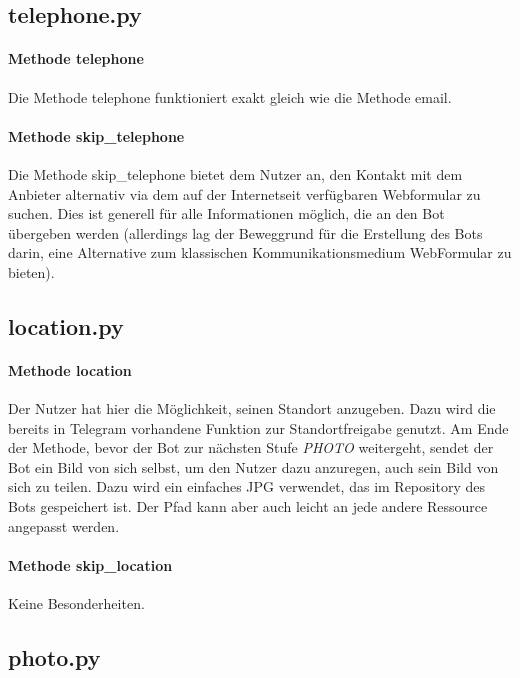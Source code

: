             
        \subsection{telephone.py}
            \paragraph{Methode telephone}
                Die Methode telephone funktioniert exakt gleich wie die Methode email.

            \paragraph{Methode skip\_telephone}
                Die Methode skip\_telephone bietet dem Nutzer an, den Kontakt mit dem Anbieter alternativ via dem auf der Internetseit verfügbaren Webformular zu suchen. Dies ist generell für alle Informationen möglich, die an den Bot übergeben werden (allerdings lag der Beweggrund für die Erstellung des Bots darin, eine Alternative zum klassischen Kommunikationsmedium Web\-Formular zu bieten).
        
        
        \subsection{location.py}
            \paragraph{Methode location}
                Der Nutzer hat hier die Möglichkeit, seinen Standort anzugeben. Dazu wird die bereits in Telegram vorhandene Funktion zur Standortfreigabe genutzt. 
                Am Ende der Methode, bevor der Bot zur nächsten Stufe \emph{PHOTO} weitergeht, sendet der Bot ein Bild von sich selbst, um den Nutzer dazu anzuregen, auch sein Bild von sich zu teilen. Dazu wird ein einfaches JPG verwendet, das im Repository des Bots gespeichert ist. Der Pfad kann aber auch leicht an jede andere Ressource angepasst werden.

            \paragraph{Methode skip\_location}
                Keine Besonderheiten.
        

        \subsection{photo.py}
